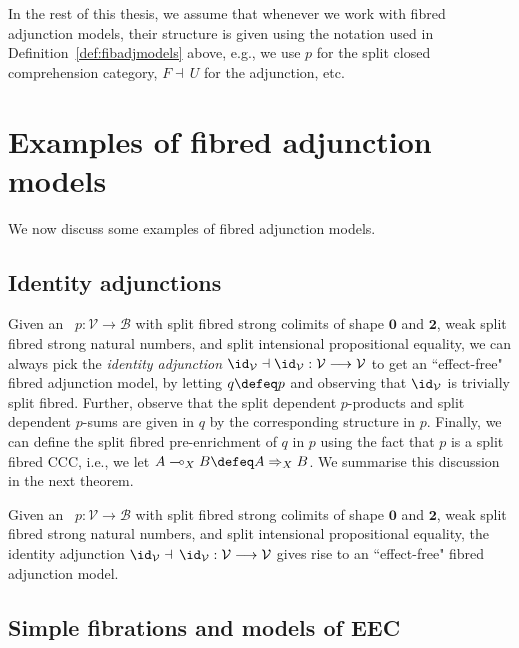 \noindent
In the rest of this thesis, we assume that whenever we work with fibred adjunction models, their structure is given using the notation used in Definition~\ref{def:fibadjmodels} above, e.g., we use $p$ for the split closed comprehension category, $F \dashv\, U$ for the adjunction, etc.


\section{Examples of fibred adjunction models}
\label{sect:examplesoffibadjmodels}

We now discuss some examples of fibred adjunction models.

\subsection{Identity adjunctions}

Given an \SCCompC\, $p : \mathcal{V} \longrightarrow \mathcal{B}$ with split fibred strong colimits of shape $\mathbf{0}$ and $\mathbf{2}$, weak split fibred strong natural numbers, and split intensional propositional equality, we can always pick the \emph{identity adjunction} $\id_{\mathcal{V}} \dashv \id_{\mathcal{V}} : \mathcal{V} \longrightarrow \mathcal{V}$ 
to get an ``effect-free" fibred adjunction model, by letting $q \defeq p$ and  observing that $\id_{\mathcal{V}}$ is trivially split fibred. Further, observe that the split dependent $p$-products and split dependent $p$-sums are given in $q$ by the corresponding structure in $p$. Finally, we can define the split fibred pre-enrichment of $q$ in $p$ using the fact that $p$ is a split fibred CCC, i.e., we let $A \multimap_X B \defeq A \Rightarrow_X B$. We summarise this discussion in the next theorem.

\begin{theorem}
\label{thm:effectfreefibadjmodel}
Given an \SCCompC\, $p : \mathcal{V} \longrightarrow \mathcal{B}$ with split fibred strong colimits of shape $\mathbf{0}$ and $\mathbf{2}$, weak split fibred strong natural numbers, and split intensional propositional equality, the identity adjunction $\id_{\mathcal{V}} \dashv\, \id_{\mathcal{V}} : \mathcal{V} \longrightarrow \mathcal{V}$ gives rise to an ``effect-free" fibred adjunction model.
\end{theorem}

\subsection[Simple fibrations and models of EEC\raisebox{0.75pt}{+}]{Simple fibrations and models of EEC\raisebox{1.75pt}{+}}
\label{sect:fibadjmodelsfromeecmodels}

